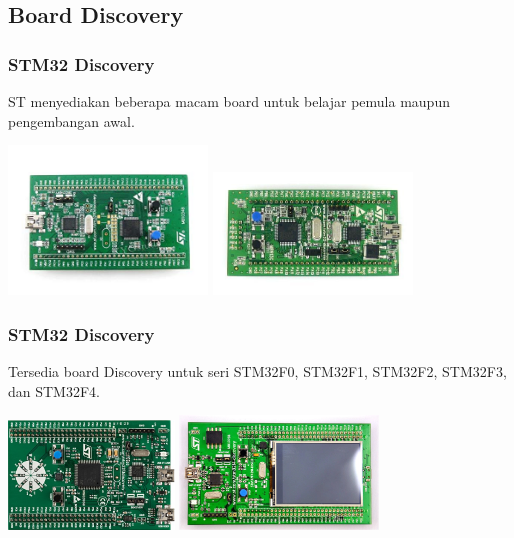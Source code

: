\documentclass[table,dvipsnames]{beamer}
\begin{document}
	\subsection{Board Discovery}
	\begin{frame}
		\frametitle{STM32 Discovery}
		\begin{block}{}
			ST menyediakan beberapa macam board untuk belajar pemula maupun pengembangan awal.
		\end{block}
		
		\begin{center}
			\includegraphics[width=150pt]{images/f0disco}
			\includegraphics[width=150pt]{images/f1disco}
		\end{center}
	\end{frame}

	\begin{frame}
		\frametitle{STM32 Discovery}
		
		\begin{block}{}
			Tersedia board Discovery untuk seri STM32F0, STM32F1, STM32F2, STM32F3, dan STM32F4.
		\end{block}
		
		\begin{center}
			\includegraphics[width=125pt]{images/f3disco}
			\includegraphics[width=150pt]{images/f4disco}
		\end{center}
	\end{frame}
\end{document}
